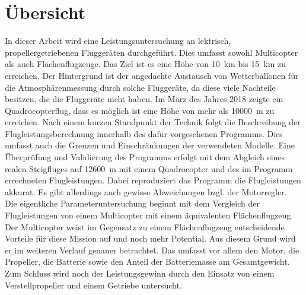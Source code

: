 \chapter*{Übersicht}
In dieser Arbeit wird eine Leistungsuntersuchung an lektrisch, propellergetriebenen Fluggeräten durchgeführt. Dies umfasst sowohl Multicopter als auch Flächenflugzeuge. Das Ziel ist es eine Höhe von \SI{10}{km} bis \SI{15}{km} zu erreichen. Der Hintergrund ist der angedachte Austausch von Wetterballonen für die Atmosphärenmessung durch solche Fluggeräte, da diese viele Nachteile besitzen, die die Fluggeräte nicht haben. Im März des Jahres 2018 zeigte ein Quadrocopterflug, dass es möglich ist eine Höhe von mehr als \SI{10000}{m} zu erreichen. 
Nach einem kurzen Standpunkt der Technik folgt die Beschreibung der Flugleistungsberechnung innerhalb des dafür vorgesehenen Programms. Dies umfasst auch die Grenzen und Einschränkungen der verwendeten Modelle. Eine Überprüfung und Validierung des Programms erfolgt mit dem Abgleich eines realen Steigfluges auf \SI{12600}{m} mit einem Quadrocopter und des im Programm errechneten Flugleistungen. Dabei reproduziert das Programm die Flugleistungen akkurat. Es gibt allerdings auch gewisse Abweichungen bzgl. der Motorregler. \\
Die eigentliche Parameteruntersuchung beginnt mit dem Vergleich der Flugleistungen von einem Multicopter mit einem äquivalenten Flächenflugzeug. Der Multicopter weist im Gegensatz zu einem Flächenflugzeug entscheidende Vorteile für diese Mission auf und noch mehr Potential. Aus diesem Grund wird er im weiteren Verlauf genauer betrachtet. Das umfasst vor allem den Motor, die Propeller, die Batterie sowie den Anteil der Batteriemasse am Gesamtgewicht. Zum Schluss wird noch der Leistungsgewinn durch den Einsatz von einem Verstellpropeller und einem Getriebe untersucht. 


